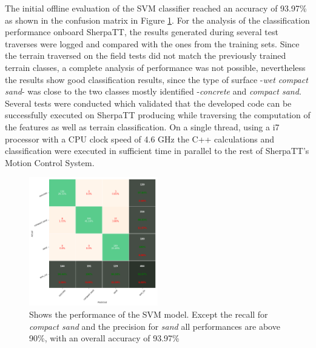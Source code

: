 \documentclass{article}
\begin{document}

The initial offline evaluation of the SVM classifier reached an accuracy of 93.97\% as shown in the confusion matrix in Figure \ref{fig:confusionmatrix}.
For the analysis of the classification performance onboard SherpaTT, the results generated during several test traverses were logged and compared with the ones from the training sets. 
Since the terrain traversed on the field tests did not match the previously trained terrain classes, a complete analysis of performance was not possible, nevertheless the results show good classification results, since the type of surface -\emph{wet compact sand}- was close to the two classes mostly identified -\emph{concrete} and \emph{compact sand}.
Several tests were conducted which validated that the developed code can be successfully executed on SherpaTT producing while traversing the computation of the features as well as terrain classification. 
On a single thread, using a i7 processor with a CPU clock speed of 4.6 GHz the C++ calculations and classification were executed in suﬃcient time in parallel to the rest of SherpaTT's Motion Control System.

\begin{figure}
\centering
\includegraphics[width=0.5\textwidth]{../figures/confusionmatrix_Train.png}
\caption{\label{fig:confusionmatrix} Shows the performance of the SVM model. Except the recall for \emph{compact sand} and the precision for \emph{sand} all performances are above 90\%, with an overall accuracy of 93.97\%}
\end{figure}





\end{document}
